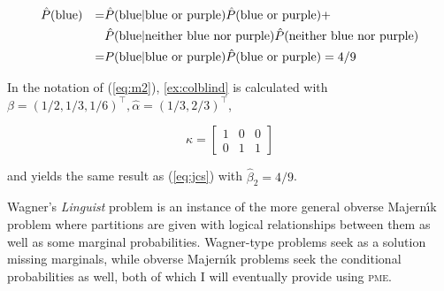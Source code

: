 \documentclass[phd,12pt,oneside]{ubcthesis}
\begin{document}
\begin{align}
  \label{eq:jcs}
&\hat{P}(\mbox{blue})&=&\hat{P}(\mbox{blue}|\mbox{blue or purple})\hat{P}(\mbox{blue or
  purple})+\notag \\
&&&\hat{P}(\mbox{blue}|\mbox{neither blue nor
  purple})\hat{P}(\mbox{neither blue nor purple})\notag \\
&&=&P(\mbox{blue}|\mbox{blue or purple})\hat{P}(\mbox{blue or
  purple})=4/9
\end{align}

{\noindent}In the notation of (\ref{eq:m2}), {\xample}
\ref{ex:colblind} is calculated with
$\beta=(1/2,1/3,1/6)^{\top},\hat{\alpha}=(1/3,2/3)^{\top}$,

\begin{equation}
  \label{eq:kappa}
  \kappa=\left[
  \begin{array}{ccc}
    1 & 0 & 0 \\
    0 & 1 & 1
  \end{array}\right]
\end{equation}

{\noindent}and yields the same result as (\ref{eq:jcs}) with
$\hat{\beta}_{2}=4/9$.

Wagner's \emph{Linguist} problem is an instance of the more general
obverse Majern{\'\i}k problem where partitions are given with logical
relationships between them as well as some marginal probabilities.
Wagner-type problems seek as a solution missing marginals, while
obverse Majern{\'\i}k problems seek the conditional probabilities as
well, both of which I will eventually provide using \textsc{pme}.

\end{document}

